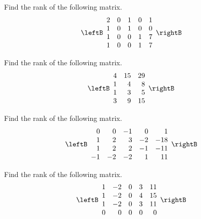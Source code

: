 \begin{enumialphparenastyle}
\begin{ex} Find the rank of the following matrix.
\begin{equation*}
\leftB
\begin{array}{rrrrr}
2 & 0 & 1 & 0 & 1 \\
1 & 0 & 1 & 0 & 0 \\
1 & 0 & 0 & 1 & 7 \\
1 & 0 & 0 & 1 & 7
\end{array}
\rightB
\end{equation*}
\end{ex}

\begin{ex} Find the rank of the following matrix.
\begin{equation*}
\leftB
\begin{array}{rrr}
4 & 15 & 29 \\
1 & 4 & 8 \\
1 & 3 & 5 \\
3 & 9 & 15
\end{array}
\rightB
\end{equation*}
\end{ex}

\begin{ex} Find the rank of the following matrix. 
\begin{equation*}
\leftB
\begin{array}{rrrrr}
0 & 0 & -1 & 0 & 1 \\
1 & 2 & 3 & -2 & -18 \\
1 & 2 & 2 & -1 & -11 \\
-1 & -2 & -2 & 1 & 11
\end{array}
\rightB
\end{equation*}
\end{ex}

\begin{ex} Find the rank of the following matrix.
\begin{equation*}
\leftB
\begin{array}{rrrrr}
1 & -2 & 0 & 3 & 11 \\
1 & -2 & 0 & 4 & 15 \\
1 & -2 & 0 & 3 & 11 \\
0 & 0 & 0 & 0 & 0
\end{array}
\rightB
\end{equation*}
\end{ex}


\end{enumialphparenastyle}
